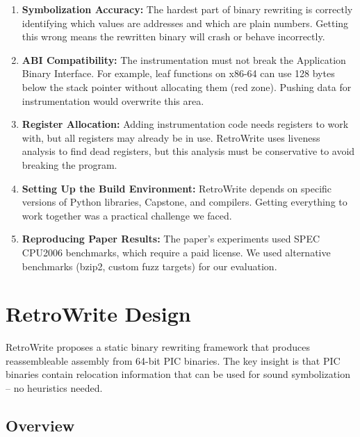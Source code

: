 \documentclass[10pt,a4paper]{article}
\begin{document}
\begin{enumerate}
    \item \textbf{Symbolization Accuracy:} The hardest part of binary rewriting is correctly identifying which values are addresses and which are plain numbers. Getting this wrong means the rewritten binary will crash or behave incorrectly.

    \item \textbf{ABI Compatibility:} The instrumentation must not break the Application Binary Interface. For example, leaf functions on x86-64 can use 128 bytes below the stack pointer without allocating them (red zone). Pushing data for instrumentation would overwrite this area.

    \item \textbf{Register Allocation:} Adding instrumentation code needs registers to work with, but all registers may already be in use. RetroWrite uses liveness analysis to find dead registers, but this analysis must be conservative to avoid breaking the program.

    \item \textbf{Setting Up the Build Environment:} RetroWrite depends on specific versions of Python libraries, Capstone, and compilers. Getting everything to work together was a practical challenge we faced.

    \item \textbf{Reproducing Paper Results:} The paper's experiments used SPEC CPU2006 benchmarks, which require a paid license. We used alternative benchmarks (bzip2, custom fuzz targets) for our evaluation.
\end{enumerate}

\section{RetroWrite Design}

RetroWrite proposes a static binary rewriting framework that produces reassembleable assembly from 64-bit PIC binaries. The key insight is that PIC binaries contain relocation information that can be used for sound symbolization -- no heuristics needed.

\subsection{Overview}
\end{document}
